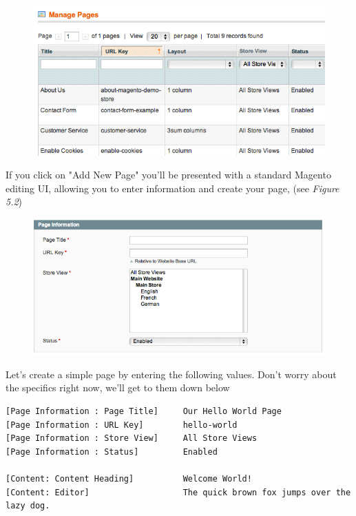 \documentclass[oneside]{book}
\begin{document}
\begin{figure}[htb]
\begin{center}
\leavevmode
\includegraphics[width=1\textwidth]{images/chapter6/cms-page.png}
\end{center}
\caption{}
\end{figure}


If you click on "Add New Page" you'll be presented with a standard Magento editing UI, allowing you to enter information and create your page, (see \emph{Figure 5.2})

\begin{figure}[htb]
\begin{center}
\leavevmode
\includegraphics[width=1\textwidth]{images/chapter6/page-info.png}
\end{center}
\caption{}
\end{figure}


Let's create a simple page by entering the following values.  Don't worry about the specifics right now, we'll get to them down below

\begin{lstlisting}
[Page Information : Page Title]     Our Hello World Page
[Page Information : URL Key]        hello-world
[Page Information : Store View]     All Store Views
[Page Information : Status]         Enabled

[Content: Content Heading]          Welcome World!
[Content: Editor]                   The quick brown fox jumps over the lazy dog.

\end{lstlisting}
\end{document}
